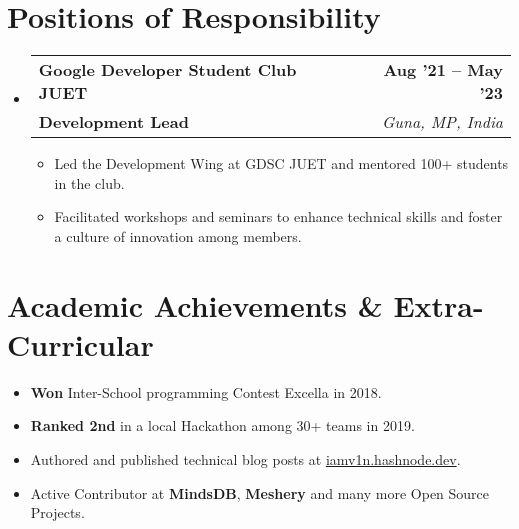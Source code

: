 \documentclass[letterpaper,11pt]{article}
\makeatletter
\newcommand{\resumeItem}[1]{
  \item\small{
    {#1 \vspace{-2pt}}
  }
}
\newcommand{\achievementItem}[1]{
  \item\small{
    {#1 \vspace{-6pt}}
  }
}
\newcommand{\resumeSubheading}[4]{
  \vspace{-2pt}\item
    \begin{tabular*}{1.0\textwidth}[t]{l@{\extracolsep{\fill}}r}
      \textbf{#1} & \textbf{\small #2} \\
      \textbf{\small#3} & \textit{\small #4} \\
    \end{tabular*}\vspace{-7pt}
}
\newcommand{\resumeSubHeadingListStart}{\begin{itemize}[leftmargin=0.0in, label={}]}
\newcommand{\resumeSubHeadingListEnd}{\end{itemize}}
\newcommand{\resumeItemListStart}{\justify \begin{itemize}}
\newcommand{\resumeItemListEnd}{\end{itemize}\vspace{-2pt}}
\makeatother
\begin{document}
\section{Positions of Responsibility}
   \resumeSubHeadingListStart
      \resumeSubheading
      {Google Developer Student Club JUET}{Aug '21 -- May '23}
      {Development Lead}{Guna, MP, India}
      \vspace{-7pt}
      \resumeItemListStart
        \resumeItem{Led the Development Wing at GDSC JUET and mentored 100+ students in the club.}
        \resumeItem{Facilitated workshops and seminars to enhance technical skills and foster a culture of innovation among members.}
      \resumeItemListEnd
  \resumeSubHeadingListEnd
 \vspace{-10pt}


\section{Academic Achievements \& Extra-Curricular}

\begin{itemize}[leftmargin=0.2in]
  \achievementItem{\textbf{Won} Inter-School programming Contest Excella in 2018.}
  \achievementItem{\textbf{Ranked 2nd} in a local Hackathon among 30+ teams in 2019.}
  \achievementItem{Authored and published technical blog posts at \href{https://iamv1n.hashnode.dev/}{ iamv1n.hashnode.dev}.}
  \achievementItem{Active Contributor at \textbf{MindsDB}, \textbf{Meshery} and many more Open Source Projects.}
\end{itemize}
        
\end{document}
